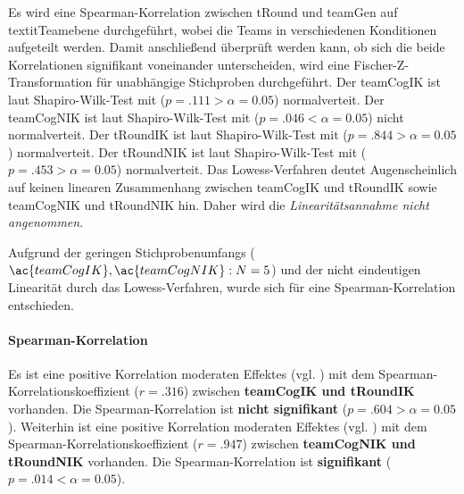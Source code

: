 \documentclass[a4paper,11pt]{article}%
\renewcommand{\\}{\vspace*{0.5\baselineskip} \newline}
\begin{document}
Es wird eine Spearman-Korrelation zwischen \ac{tRound} und \ac{teamGen} auf textit{Teamebene} durchgeführt, wobei die Teams in verschiedenen Konditionen aufgeteilt werden. Damit anschließend überprüft werden kann, ob sich die beide Korrelationen signifikant voneinander unterscheiden, wird eine Fischer-Z-Transformation für unabhängige Stichproben durchgeführt.\\
%
Der \ac{teamCogIK} ist laut Shapiro-Wilk-Test mit ($p = .111 > \alpha = 0.05$) normalverteit. \newline
Der \ac{teamCogNIK} ist laut Shapiro-Wilk-Test mit ($p = .046 < \alpha = 0.05$) nicht normalverteit. \newline
Der \ac{tRoundIK} ist laut Shapiro-Wilk-Test mit ($p = .844 > \alpha = 0.05$) normalverteit. \newline
Der \ac{tRoundNIK} ist laut Shapiro-Wilk-Test mit ($p = .453 > \alpha = 0.05$) normalverteit. \\
Das Lowess-Verfahren deutet Augenscheinlich auf keinen linearen Zusammenhang zwischen \ac{teamCogIK} und \ac{tRoundIK} sowie \ac{teamCogNIK} und \ac{tRoundNIK} hin. Daher wird die \textit{Linearitätsannahme nicht angenommen}.

Aufgrund der geringen Stichprobenumfangs ($\ac{teamCogIK}, \ac{teamCogNIK} : N=5$) und der nicht eindeutigen Linearität durch das Lowess-Verfahren, wurde sich für eine Spearman-Korrelation entschieden.

\paragraph{Spearman-Korrelation}
Es ist eine positive Korrelation moderaten Effektes (vgl. \cite{cohen2013statistical}) mit dem Spearman-Korrelationskoeffizient ($r = .316$) zwischen \textbf{\ac{teamCogIK} und \ac{tRoundIK}} vorhanden. Die Spearman-Korrelation ist \textbf{nicht signifikant} ($p = .604 > \alpha = 0.05$).\\
Weiterhin ist eine positive Korrelation moderaten Effektes (vgl. \cite{cohen2013statistical}) mit dem Spearman-Korrelationskoeffizient ($r = .947$) zwischen \textbf{\ac{teamCogNIK} und \ac{tRoundNIK}} vorhanden. Die Spearman-Korrelation ist \textbf{signifikant} ($p = .014 < \alpha = 0.05$).
\end{document}
